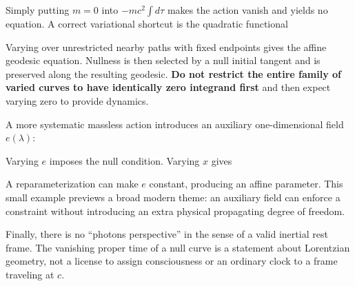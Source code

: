 \documentclass[
  11pt,
  letterpaper,
  oneside,
  openany]{scrbook}
\begin{document}
Simply putting \(m=0\) into \(-mc^2\int d\tau\) makes the action vanish
and yields no equation. A correct variational shortcut is the quadratic
functional

\begin{center}
\begingroup
{}
\ifdim\wd\grmathbox>\linewidth
\resizebox{\linewidth}{!}{\usebox{\grmathbox}}
\else\usebox{\grmathbox}\fi
\endgroup
\end{center}

Varying over unrestricted nearby paths with fixed endpoints gives the
affine geodesic equation. Nullness is then selected by a null initial
tangent and is preserved along the resulting geodesic. \textbf{Do not
restrict the entire family of varied curves to have identically zero
integrand first} and then expect varying zero to provide dynamics.

A more systematic massless action introduces an auxiliary
one-dimensional field \(e(\lambda)\):

\begin{center}
\begingroup
{}
\ifdim\wd\grmathbox>\linewidth
\resizebox{\linewidth}{!}{\usebox{\grmathbox}}
\else\usebox{\grmathbox}\fi
\endgroup
\end{center}

Varying \(e\) imposes the null condition. Varying \(x\) gives

\begin{center}
\begingroup
{}
\ifdim\wd\grmathbox>\linewidth
\resizebox{\linewidth}{!}{\usebox{\grmathbox}}
\else\usebox{\grmathbox}\fi
\endgroup
\end{center}

A reparameterization can make \(e\) constant, producing an affine
parameter. This small example previews a broad modern theme: an
auxiliary field can enforce a constraint without introducing an extra
physical propagating degree of freedom.

Finally, there is no ``photon\textquotesingle s perspective'' in the
sense of a valid inertial rest frame. The vanishing proper time of a
null curve is a statement about Lorentzian geometry, not a license to
assign consciousness or an ordinary clock to a frame traveling at \(c\).
\end{document}
